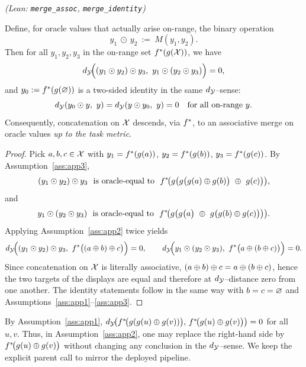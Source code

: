 \begin{proposition}\label{prop:odot}
\emph{(Lean: \texttt{merge\_assoc}, \texttt{merge\_identity})}

Define, for oracle values that actually arise on-range, the binary operation
\[
y_1\ \odot\ y_2\ :=\ M(y_1,y_2).
\]
Then for all $y_1,y_2,y_3$ in the on-range set $f^{\ast}(g(\mathcal{X}))$, we have
\[
\metric\!\Big((y_1\odot y_2)\odot y_3,\ y_1\odot(y_2\odot y_3)\Big)=0,
\]
and $y_0:=f^{\ast}(g(\varnothing))$ is a two-sided identity in the same $d_{\mathcal{Y}}$–sense:
\[
d_{\mathcal{Y}}(y_0\odot y,\ y)=d_{\mathcal{Y}}(y\odot y_0,\ y)=0\quad\text{for all on-range }y.
\]
Consequently, concatenation on $\mathcal{X}$ descends, via $f^{\ast}$, to an associative merge on oracle values \emph{up to the task metric}.
\end{proposition}

\begin{proof}
Pick $a,b,c\in\mathcal{X}$ with $y_1=f^{\ast}(g(a))$, $y_2=f^{\ast}(g(b))$, $y_3=f^{\ast}(g(c))$. By Assumption~\ref{ass:app3},
\[
(y_1\odot y_2)\odot y_3\ \text{ is oracle-equal to }\ \fstar\!\big(g\big(g\big(g(a)\concat g(b)\big)\ \concat\ g(c)\big)\big),
\]
and
\[
y_1\odot(y_2\odot y_3)\ \text{ is oracle-equal to }\ f^{\ast}\!\big(g\big(g\big(a\big)\ \oplus\ g\big(g(b)\oplus g(c)\big)\big)\big).
\]
Applying Assumption~\ref{ass:app2} twice yields
\[
d_{\mathcal{Y}}\!\Big((y_1\odot y_2)\odot y_3,\ f^{\ast}\big((a\oplus b)\oplus c\big)\Big)=0,\qquad
d_{\mathcal{Y}}\!\Big(y_1\odot (y_2\odot y_3),\ f^{\ast}\big(a\oplus(b\oplus c)\big)\Big)=0.
\]
Since concatenation on $\mathcal{X}$ is literally associative, $(a\oplus b)\oplus c=a\oplus(b\oplus c)$, hence the two targets of the displays are equal and therefore at $d_{\mathcal{Y}}$–distance zero from one another. The identity statements follow in the same way with $b=c=\varnothing$ and Assumptions~\ref{ass:app1}–\ref{ass:app3}.
\end{proof}

\begin{remark}
By Assumption~\ref{ass:app1}, $d_{\mathcal{Y}}\!\big(f^{\ast}\!\big(g(g(u)\oplus g(v))\big),\,f^{\ast}\!\big(g(u)\oplus g(v)\big)\big)=0$ for all $u,v$. Thus, in Assumption~\ref{ass:app2}, one may replace the right-hand side by $f^{\ast}\!\big(g(u)\oplus g(v)\big)$ without changing any conclusion in the $d_{\mathcal{Y}}$–sense. We keep the explicit parent call to mirror the deployed pipeline.
\end{remark}

